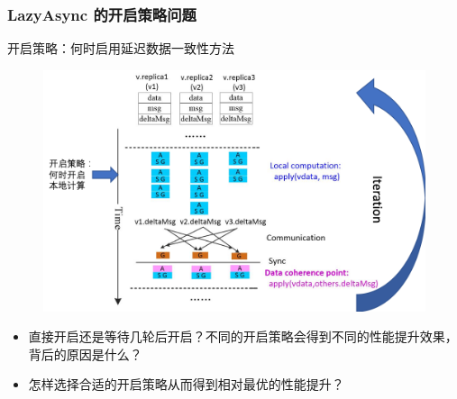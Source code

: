 \documentclass[10pt]{beamer}
\begin{document}
\begin{frame}%
  \frametitle{LazyAsync 的开启策略问题}
  \vspace{-1em}
  \begin{block}
    {开启策略：何时启用延迟数据一致性方法}
    \begin{figure}[!htbp]
      \centering
      \includegraphics[height=0.5\textwidth]{Img/turn_on.png}
    \end{figure}

    \begin{itemize}
      \item 直接开启还是等待几轮后开启？不同的开启策略会得到不同的性能提升效果，背后的原因是什么？
      \item 怎样选择合适的开启策略从而得到相对最优的性能提升？
    \end{itemize}
  \end{block}
\end{frame}
\end{document}
